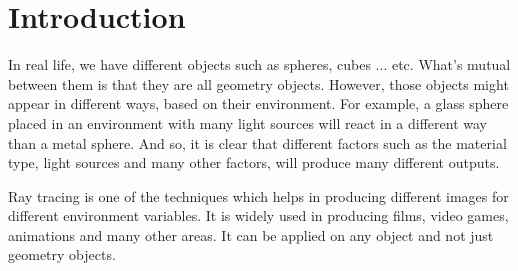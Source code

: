 \documentclass[a4paper]{article}
\begin{document}
	\section{Introduction}
	
	In real life, we have different objects such as spheres, cubes ... etc. What's mutual between them is that they are all geometry objects. However, those objects might appear in different ways, based on their environment. For example, a glass sphere placed in an environment with many light sources will react in a different way than a metal sphere. And so, it is clear that different factors such as the material type, light sources and many other factors, will produce many different outputs. \\
	\par Ray tracing is one of the techniques which helps in producing different images for different environment variables. It is widely used in producing films, video games, animations and many other areas. It can be applied on any object and not just geometry objects.
\end{document}
